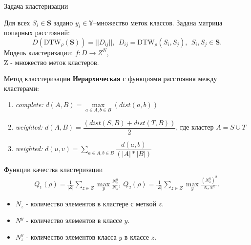 \documentclass{beamer}
\begin{document}
\begin{frame}

    \begin{block}{Задача кластеризации}

        Для всех $S_i \in \boldsymbol{S}$ задано ${y_i \in \mathbb{Y}}$\---множество меток классов.
        Задана матрица попарных расстояний:
        $$D(\text{DTW}_\rho(\boldsymbol{S})) = ||D_{ij}||, \ \ D_{ij} = \text{DTW}_\rho(S_i, S_j),\ \ S_i, S_j \in \boldsymbol{S}.$$
        Модель кластеризации: $f: D \rightarrow Z^N$,\\ Z \-- множество меток кластеров.

    \end{block}

    \begin{block}{Метод класстеризации}
        \textbf{Иерархическая} с функциями расстояния между кластерами: 
        \begin{enumerate}
            \item \textit{complete:}  $d(A, B) = \max\limits_{a \in A, b \in B}(dist(a, b))$ 
            \item \textit{weighted:}  $d(A,B) = \dfrac{(dist(S,B) + dist(T,B))}{2}$, где кластер $A = S \cup T$
            \item \textit{weighted:}  $d(u,v) = \sum\limits_{a \in A, b \in B} \dfrac{d(a, b)}{(|A|*|B|)}$ 
        \end{enumerate} 
    \end{block}
\end{frame}

\begin{frame}
    \begin{block}{Функции качества кластеризации}
        \begin{align*}
            Q_1(\rho) = \frac{1}{|Z|}\sum\limits_{z \in Z} \max_y \frac{N_z^y}{N_z},\  Q_2(\rho) = \frac{1}{|Z|}\sum\limits_{z \in Z} \max_y \frac{(N_z^y)^2}{N_z N^y}.
        \end{align*}
        \begin{itemize}
            \item $N_z$ \-- количество элементов в кластере с меткой $z$. 
            \item $N^y$ \-- количество элементов в классе $y$.
            \item $N_z^y$ \-- количество элементов класса $y$ в классе $z$.
        \end{itemize}
    \end{block}
\end{frame}
\end{document}
